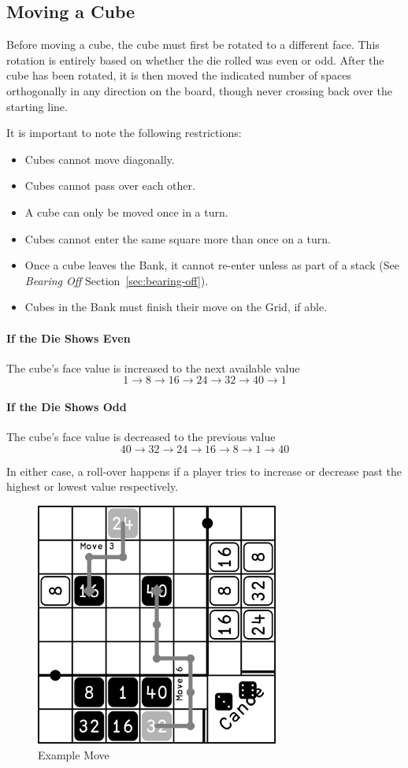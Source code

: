 \subsection{Moving a Cube}
Before moving a cube, the cube must first be rotated to a different face.
This rotation is entirely based on whether the die rolled was even or odd.
After the cube has been rotated, it is then moved the indicated number of spaces orthogonally in any direction on the board, though never crossing back over the starting line.

It is important to note the following restrictions:
\begin{itemize}
    \item Cubes cannot move diagonally.
    \item Cubes cannot pass over each other.
    \item A cube can only be moved once in a turn.
    \item Cubes cannot enter the same square more than once on a turn.
    \item Once a cube leaves the Bank, it cannot re-enter unless as part of a stack (See \textit{Bearing Off} Section~\ref{sec:bearing-off}).
    \item Cubes in the Bank must finish their move on the Grid, if able.
\end{itemize}

\paragraph{If the Die Shows Even} The cube's face value is increased to the next available value
$$1 \to 8 \to 16 \to 24 \to 32 \to 40 \to 1$$
\paragraph{If the Die Shows Odd} The cube's face value is decreased to the previous value
$$40 \to 32 \to 24 \to 16 \to 8 \to 1 \to 40$$

\note In either case, a roll-over happens if a player tries to increase or decrease past the highest or lowest value respectively.

\begin{figure}[!ht]
    \centering
    \includegraphics[width=8cm]{../graphics/movement}
    \caption{Example Move}
    \label{fig:move}
\end{figure}

